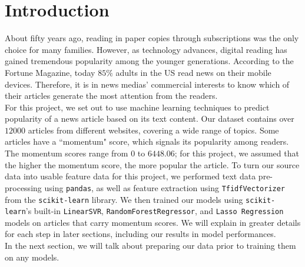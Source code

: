 
\section{Introduction}
\label{sec:intro}

About fifty years ago, reading in paper copies through subscriptions was the only choice for many families. However, as technology advances, digital reading has gained tremendous popularity among the younger generations. According to the Fortune Magazine, today $85\%$ adults in the US read news on their mobile devices. Therefore, it is in news medias' commercial interests to know which of their articles generate the most attention from the readers.\\ 

For this project, we set out to use machine learning techniques to predict popularity of a news article based on its text content. Our dataset contains over $12000$ articles from different websites, covering a wide range of topics. Some articles have a ``momentum" score, which signals its popularity among readers. The momentum scores range from $0$ to $6448.06$; for this project, we assumed that the higher the momentum score, the more popular the article. To turn our source data into usable feature data for this project, we performed text data pre-processing using \texttt{pandas}, as well as feature extraction using \texttt{TfidfVectorizer} from the \texttt{scikit-learn} library\cite{scikit-learn}. We then trained our models using \texttt{scikit-learn}'s built-in \texttt{LinearSVR}, \texttt{RandomForestRegressor}, and \texttt{Lasso Regression} models on articles that carry momentum scores. We will explain in greater details for each step in later sections, including our results in model performances.\\

In the next section, we will talk about preparing our data prior to training them on any models. 




